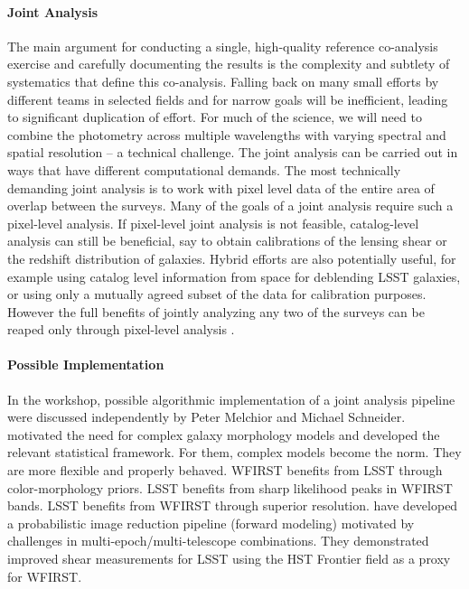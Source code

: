 \paragraph*{Joint Analysis} The main argument for conducting a single,
high-quality reference co-analysis exercise and carefully documenting the
results is the complexity and subtlety of systematics that define this
co-analysis. Falling back on many small efforts by different teams in selected
fields and for narrow goals will be inefficient, leading to significant
duplication of effort.  For much of the science, we will need to combine the
photometry across multiple wavelengths with varying spectral and spatial
resolution – a technical challenge. The joint analysis can be carried out in
ways that have different computational demands. The most technically demanding
joint analysis is to work with pixel level data of the entire area of overlap
between the surveys. Many of the goals of a joint analysis require such a
pixel-level analysis. If pixel-level joint analysis is not feasible,
catalog-level analysis can still be beneficial, say to obtain calibrations of
the lensing shear or the redshift distribution of galaxies. Hybrid efforts are
also potentially useful, for example using catalog level information from space
for deblending LSST galaxies, or using only a mutually agreed subset of the data
for calibration purposes. However the full benefits of jointly analyzing any two
of the surveys can be reaped only through pixel-level analysis \citep{Jain:2015cpa}.

\paragraph*{Possible Implementation} In the workshop, possible algorithmic
implementation of a joint analysis pipeline were discussed independently by
Peter Melchior and Michael Schneider. \citet{Melchior:2016asy} motivated the
need for complex galaxy morphology models and developed the relevant statistical
framework. For them, complex models become the norm. They are more flexible and properly
behaved. WFIRST benefits from LSST through color-morphology priors. LSST
benefits from sharp likelihood peaks in WFIRST bands. LSST benefits from WFIRST
through superior resolution. \citet{Schneider:2014rha} have developed a probabilistic
image reduction pipeline (forward modeling) motivated by challenges in
multi-epoch/multi-telescope combinations. They demonstrated improved shear
measurements for LSST using the HST Frontier field as a proxy for WFIRST.

